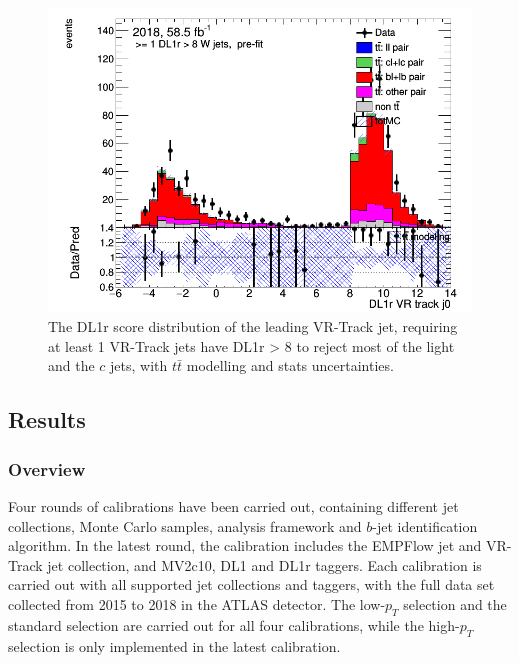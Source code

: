 \documentclass[letterpaper,12pt]{article}
\begin{document}
\begin{figure}
    \centering
    \begin{minipage}[b]{.45\textwidth}
\centering
\includegraphics[width=1\textwidth]{3bplots/3bplots.png}
\end{minipage}
	\caption{The DL1r score distribution of the leading VR-Track jet, 
	requiring at least 1 VR-Track jets have DL1r > 8 to reject most of 
	the light and the $c$ jets, with $t\bar{t}$ modelling and stats uncertainties. }
    \label{fig:3bplots}
\end{figure}


\subsection{Results}
\label{result}


\subsubsection{Overview}
Four rounds of calibrations have been carried out, containing different 
jet collections, Monte Carlo samples, analysis framework 
and $b$-jet identification algorithm. In the latest round, 
the calibration includes the EMPFlow jet and VR-Track jet collection, 
and MV2c10, DL1 and DL1r taggers. Each calibration is carried out 
with all supported jet collections and taggers, with the full data 
set collected from 2015 to 2018 in the ATLAS detector. The low-$p_T$ 
selection and the standard selection are carried out for all four 
calibrations, while the high-$p_T$ selection is only implemented 
in the latest calibration. 
\end{document}
